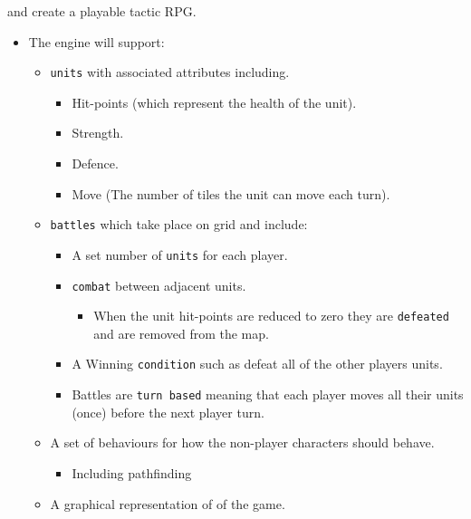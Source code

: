 \documentclass[11pt]{article}
\begin{document}
and create a playable tactic RPG. 

\begin{itemize}
\item The engine will support:

\begin{itemize}
\item \texttt{units} with associated attributes including.

\begin{itemize}
\item Hit-points (which represent the health of the unit).

\item Strength.

\item Defence.

\item Move (The number of tiles the unit can move each turn).

\end{itemize}

\item \texttt{battles} which take place on grid and include:

\begin{itemize}
\item A set number of \texttt{units} for each player.

\item \texttt{combat} between adjacent units.

\begin{itemize}
\item When the unit hit-points are reduced to zero they are \texttt{defeated} and are removed from the map.

\end{itemize}

\item A Winning \texttt{condition} such as defeat all of the other players units.

\item Battles are \texttt{turn based} meaning that each player moves all their units (once) before the next player turn.

\end{itemize}

\item A set of behaviours for how the non-player characters should behave.

\begin{itemize}
\item Including pathfinding

\end{itemize}

\item A graphical representation of of the game.

\end{itemize}

\end{itemize}
\end{document}
